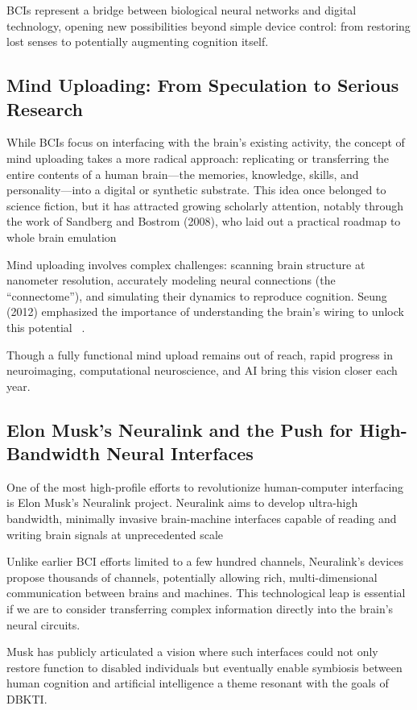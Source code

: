 \documentclass[12pt]{article}
\begin{document}
BCIs represent a bridge between biological neural networks and digital technology, opening new possibilities beyond simple device control: from restoring lost senses to potentially augmenting cognition itself.
\subsection{Mind Uploading: From Speculation to Serious Research}
While BCIs focus on interfacing with the brain’s existing activity, the concept of mind uploading takes a more radical approach: replicating or transferring the entire contents of a human brain—the memories, knowledge, skills, and personality—into a digital or synthetic substrate. This idea once belonged to science fiction, but it has attracted growing scholarly attention, notably through the work of Sandberg and Bostrom (2008), who laid out a practical roadmap to whole brain emulation ~\cite{sandberg2008whole}

Mind uploading involves complex challenges: scanning brain structure at nanometer resolution, accurately modeling neural connections (the “connectome”), and simulating their dynamics to reproduce cognition. Seung (2012) emphasized the importance of understanding the brain’s wiring to unlock this potential ~\cite{seung2012connectome}.

Though a fully functional mind upload remains out of reach, rapid progress in neuroimaging, computational neuroscience, and AI bring this vision closer each year.

\subsection{Elon Musk’s Neuralink and the Push for High-Bandwidth Neural Interfaces}
One of the most high-profile efforts to revolutionize human-computer interfacing is Elon Musk’s Neuralink project. Neuralink aims to develop ultra-high bandwidth, minimally invasive brain-machine interfaces capable of reading and writing brain signals at unprecedented scale ~\cite{musk2021neuralink}

Unlike earlier BCI efforts limited to a few hundred channels, Neuralink’s devices propose thousands of channels, potentially allowing rich, multi-dimensional communication between brains and machines. This technological leap is essential if we are to consider transferring complex information directly into the brain’s neural circuits.

Musk has publicly articulated a vision where such interfaces could not only restore function to disabled individuals but eventually enable symbiosis between human cognition and artificial intelligence a theme resonant with the goals of DBKTI.
\end{document}
